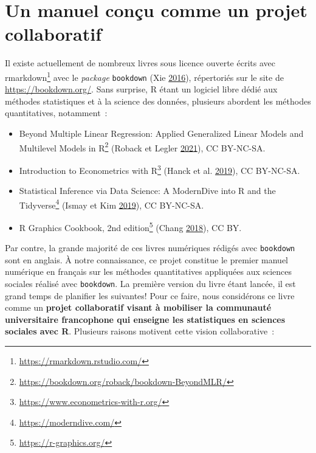 \documentclass[
  11pt,
  french,
]{book}
\providecommand{\tightlist}{%
  \setlength{\itemsep}{0pt}\setlength{\parskip}{0pt}}
\renewcommand{\href}[2]{#2\footnote{\url{#1}}}
\begin{document}
\hypertarget{sect002}{%
\section*{Un manuel conçu comme un projet collaboratif}\label{sect002}}

Il existe actuellement de nombreux livres sous licence ouverte écrits avec \href{https://rmarkdown.rstudio.com/}{rmarkdown} avec le \emph{package} \texttt{bookdown} (Xie \protect\hyperlink{ref-xie2016bookdown}{2016}), répertoriés sur le site de \url{https://bookdown.org/}. Sans surprise, R étant un logiciel libre dédié aux méthodes statistiques et à la science des données, plusieurs abordent les méthodes quantitatives, notamment~:

\begin{itemize}
\tightlist
\item
  \href{https://bookdown.org/roback/bookdown-BeyondMLR/}{Beyond Multiple Linear Regression: Applied Generalized Linear Models and Multilevel Models in R} (Roback et Legler \protect\hyperlink{ref-roback2021beyond}{2021}), CC BY-NC-SA.
\item
  \href{https://www.econometrics-with-r.org/}{Introduction to Econometrics with R} (Hanck et al. \protect\hyperlink{ref-hanck2019introduction}{2019}), CC BY-NC-SA.
\item
  \href{https://moderndive.com/}{Statistical Inference via Data Science: A ModernDive into R and the Tidyverse} (Ismay et Kim \protect\hyperlink{ref-ismay2019statistical}{2019}), CC BY-NC-SA.
\item
  \href{https://r-graphics.org/}{R Graphics Cookbook, 2nd edition} (Chang \protect\hyperlink{ref-Chang2018}{2018}), CC BY.
\end{itemize}

Par contre, la grande majorité de ces livres numériques rédigés avec \texttt{bookdown} sont en anglais. À notre connaissance, ce projet constitue le premier manuel numérique en français sur les méthodes quantitatives appliquées aux sciences sociales réalisé avec \texttt{bookdown}. La première version du livre étant lancée, il est grand temps de planifier les suivantes! Pour ce faire, nous considérons ce livre comme un \textbf{projet collaboratif visant à mobiliser la communauté universitaire francophone qui enseigne les statistiques en sciences sociales avec R}. Plusieurs raisons motivent cette vision collaborative~:
\end{document}
